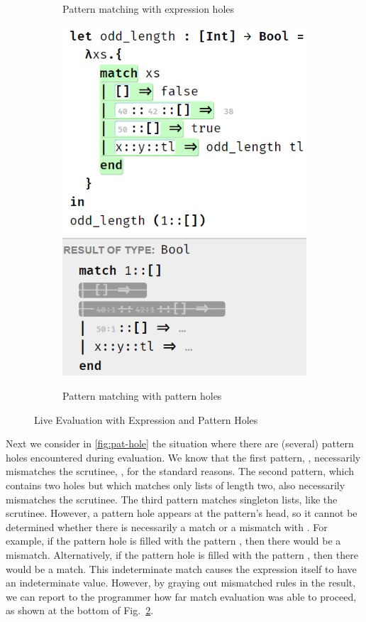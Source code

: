 \begin{figure}
\begin{subfigure}[t]{0.45\textwidth}
\caption{Pattern matching with expression holes\label{fig:exp-hole}}
\end{subfigure}
\begin{subfigure}[t]{0.45\textwidth}
\centering
{\includegraphics[scale=0.47,valign=t]{imgs/pat_match_pat_holes.png}}
\caption{Pattern matching with pattern holes\label{fig:pat-hole}}
\end{subfigure}
\vspace{-3px}
  \caption{Live Evaluation with Expression and Pattern Holes}
  \vspace{-3px}
  \label{fig:evaluation-ex}
\end{figure}


Next we consider in \autoref{fig:pat-hole} the situation where there are (several) pattern holes encountered during evaluation. 
We know that the first pattern, \li{[]}, necessarily mismatches the scrutinee, , for the standard reasons.
The second pattern, which contains two holes but which matches only lists of length two, also necessarily mismatches the scrutinee.
The third pattern matches singleton lists, like the scrutinee. However, a pattern hole appears at the pattern's head, so it cannot be determined 
whether there is necessarily a match or a mismatch with . For example, if the pattern hole is filled with the pattern , 
then there would be a mismatch. Alternatively, if the pattern hole is filled with the pattern , then there would be a match. This indeterminate match causes the  expression itself to have an indeterminate value.
However, by graying out mismatched rules in the result, we can report to the programmer how far match evaluation was able to proceed, as shown at the bottom of Fig.~\ref{fig:pat-hole}.